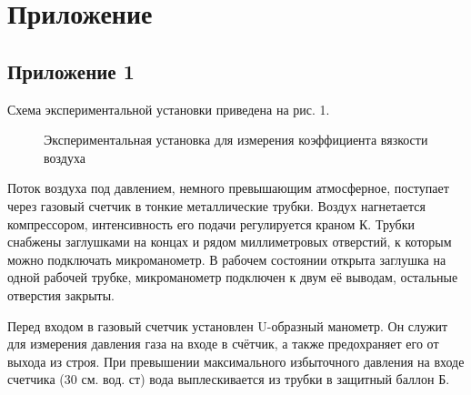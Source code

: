 \section{Приложение}
\subsection{Приложение 1} \label{Приложение 1}
Схема экспериментальной установки приведена на рис. 1.
\begin{figure}[ht]
    \label{figure1}
    \caption{Экспериментальная установка для измерения коэффициента вязкости воздуха}
\end{figure}

Поток воздуха под давлением, немного превышающим атмосферное, поступает через газовый счетчик в тонкие металлические трубки. Воздух нагнетается компрессором, интенсивность его подачи регулируется краном К. Трубки снабжены заглушками на концах и рядом миллиметровых отверстий, к которым можно подключать микроманометр. В рабочем состоянии открыта заглушка на одной рабочей трубке, микроманометр подключен к двум её выводам, остальные отверстия закрыты. 

Перед входом в газовый счетчик установлен U-образный манометр. Он служит для измерения давления газа на входе в счётчик, а также предохраняет его от выхода из строя. При превышении максимального избыточного давления на входе счетчика (30 см. вод. ст) вода выплескивается из трубки в защитный баллон Б.
\newpage
